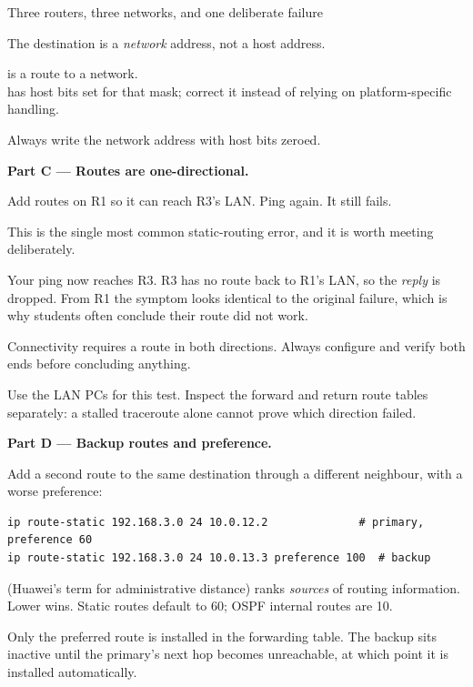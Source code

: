 \begin{labproject}{Three routers, three networks, and one deliberate failure}
\begin{pitfall}
The destination is a \emph{network} address, not a host address.

 is a route to a network.\\
 has host bits set for that mask; correct it instead of relying on platform-specific handling.

Always write the network address with host bits zeroed.
\end{pitfall}

\medskip\noindent\textbf{Part C --- Routes are one-directional.}\par
Add routes on R1 so it can reach R3's LAN. Ping again. It still fails.

\begin{keyidea}
This is the single most common static-routing error, and it is worth meeting deliberately.

Your ping now reaches R3. R3 has no route back to R1's LAN, so the \emph{reply} is dropped. From R1 the symptom looks identical to the original failure, which is why students often conclude their route did not work.

Connectivity requires a route in both directions. Always configure and verify both ends before concluding anything.
\end{keyidea}

Use the LAN PCs for this test. Inspect the forward and return route tables separately: a stalled traceroute alone cannot prove which direction failed.

\medskip\noindent\textbf{Part D --- Backup routes and preference.}\par
Add a second route to the same destination through a different neighbour, with a worse preference:

\begin{lstlisting}[style=utpterminal]
ip route-static 192.168.3.0 24 10.0.12.2              # primary, preference 60
ip route-static 192.168.3.0 24 10.0.13.3 preference 100  # backup
\end{lstlisting}

\begin{keyidea}
 (Huawei's term for administrative distance) ranks \emph{sources} of routing information. Lower wins. Static routes default to 60; OSPF internal routes are 10.

Only the preferred route is installed in the forwarding table. The backup sits inactive until the primary's next hop becomes unreachable, at which point it is installed automatically.


\end{keyidea}
\end{labproject}
